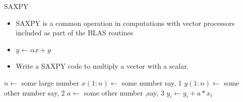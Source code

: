 \documentclass[10pt,t]{beamer}
\begin{document}
\begin{frame}{\small SAXPY}
  \begin{itemize}
    \item SAXPY is a common operation in computations with vector processors included as part of the BLAS routines
    \item[] $y\leftarrow \alpha x + y$
    \item Write a SAXPY code to multiply a vector with a scalar.
  \end{itemize}
  \begin{algorithm}[H]
    \caption{Pseudo Code for SAXPY}
    \begin{algorithmic}
      \State $n \gets$ some large number
      \State $x(1:n) \gets$ some number say, 1
      \State $y(1:n) \gets$ some other number say, 2
      \State $a \gets$ some other number ,say, 3
      \State $y_i \gets y_i + a * x_i$
      \EndDo
    \end{algorithmic}
  \end{algorithm}
\end{frame}
\end{document}
